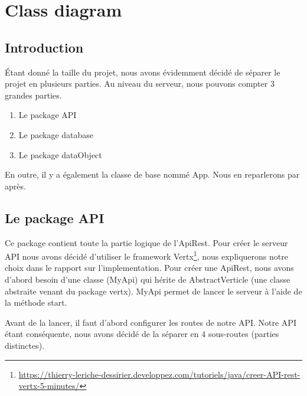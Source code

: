 \section{Class diagram}

\subsection{Introduction}
\begin{flushleft}
Étant donné la taille du projet, nous avons évidemment décidé de séparer le projet en plusieurs parties. Au niveau du serveur, nous pouvons compter 3 grandes parties.
\end{flushleft}

\begin{enumerate}[-]
\item Le package API
\item Le package database
\item Le package dataObject
\end{enumerate}

\begin{flushleft}
En outre, il y a également la classe de base nommé App. Nous en reparlerons par après.
\end{flushleft}
\newpage
\subsection{Le package API}

\begin{flushleft}
Ce package contient toute la partie logique de l'ApiRest. Pour créer le serveur API nous avons décidé d'utiliser le framework Vertx\footnote{\url{https://thierry-leriche-dessirier.developpez.com/tutoriels/java/creer-API-rest-vertx-5-minutes/}}, nous expliquerons notre choix dans le rapport sur l'implementation. Pour créer une ApiRest, nous avons d'abord besoin d'une classe (MyApi) qui hérite de AbstractVerticle (une classe abstraite venant du package vertx). MyApi permet de lancer le serveur à l'aide de la méthode start.
\end{flushleft}

\begin{flushleft}
Avant de la lancer, il faut d'abord configurer les routes de notre API. Notre API étant conséquente, nous avons décidé de la séparer en 4 sous-routes (parties distinctes).
\end{flushleft}

